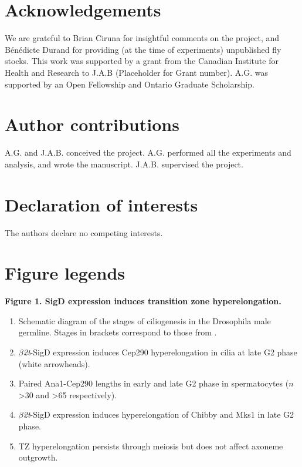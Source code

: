 \documentclass[12pt, twoside, letterpaper]{article}
\newcommand{\sigd}{$\beta$\textit{2t}-SigD}
\begin{document}
\begin{doublespacing}
\begin{linenumbers}
    \section{Acknowledgements}
    We are grateful to Brian Ciruna for insightful comments on the project,
    and B{\'e}n{\'e}dicte Durand for providing (at the time of experiments)
    unpublished fly stocks.
    This work was supported by a grant from the Canadian Institute for
    Health and Research to J.A.B (Placeholder for Grant number).
    A.G. was supported by an Open Fellowship and Ontario Graduate Scholarship.
    
    \section{Author contributions}
    A.G. and J.A.B. conceived the project.
    A.G. performed all the experiments and analysis, and wrote the manuscript.
    J.A.B. supervised the project.
    
    \section{Declaration of interests}
    The authors declare no competing interests.

    \section{Figure legends}
    
    \textbf{Figure 1. SigD expression induces transition zone hyperelongation.}
    \begin{enumerate}[label={(\Alph*)}, nolistsep]
    \item Schematic diagram of the stages of ciliogenesis in the Drosophila male germline.
      Stages in brackets correspond to those from \citep{cenci1994chromatin}.
    \item \sigd{} expression induces Cep290 hyperelongation in cilia at late G2 phase (white arrowheads).
    \item Paired Ana1-Cep290 lengths in early and late G2 phase in spermatocytes ($n$ >30 and >65 respectively).
    \item \sigd{} expression induces hyperelongation of Chibby and Mks1 in late G2 phase.
    \item TZ hyperelongation persists through meiosis but does not affect
      axoneme outgrowth.
    \end{enumerate}
    

\end{linenumbers}
\end{doublespacing}
\end{document}
